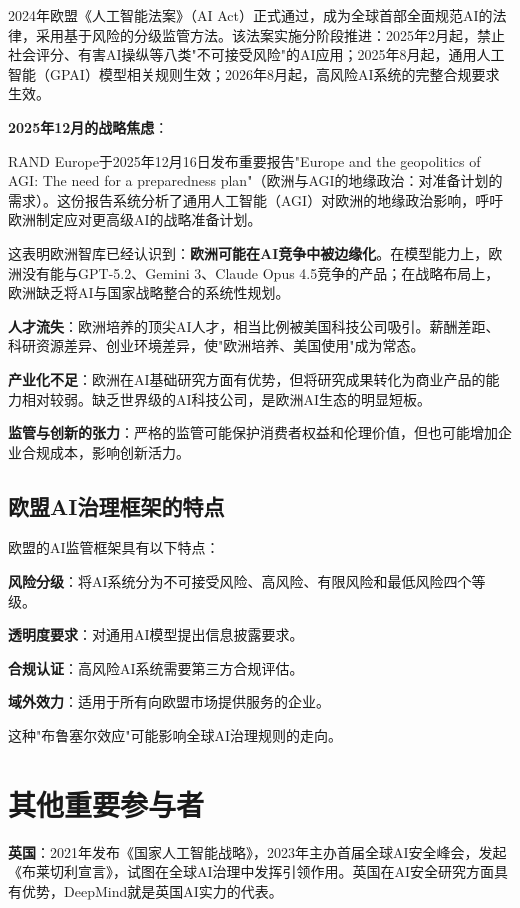 2024年欧盟《人工智能法案》（AI Act）正式通过，成为全球首部全面规范AI的法律，采用基于风险的分级监管方法。该法案实施分阶段推进：2025年2月起，禁止社会评分、有害AI操纵等八类"不可接受风险"的AI应用；2025年8月起，通用人工智能（GPAI）模型相关规则生效；2026年8月起，高风险AI系统的完整合规要求生效。

\textbf{2025年12月的战略焦虑}：

RAND Europe于2025年12月16日发布重要报告"Europe and the geopolitics of AGI: The need for a preparedness plan"（欧洲与AGI的地缘政治：对准备计划的需求）。这份报告系统分析了通用人工智能（AGI）对欧洲的地缘政治影响，呼吁欧洲制定应对更高级AI的战略准备计划。

这表明欧洲智库已经认识到：\textbf{欧洲可能在AI竞争中被边缘化}。在模型能力上，欧洲没有能与GPT-5.2、Gemini 3、Claude Opus 4.5竞争的产品；在战略布局上，欧洲缺乏将AI与国家战略整合的系统性规划。

\textbf{人才流失}：欧洲培养的顶尖AI人才，相当比例被美国科技公司吸引。薪酬差距、科研资源差异、创业环境差异，使"欧洲培养、美国使用"成为常态。

\textbf{产业化不足}：欧洲在AI基础研究方面有优势，但将研究成果转化为商业产品的能力相对较弱。缺乏世界级的AI科技公司，是欧洲AI生态的明显短板。

\textbf{监管与创新的张力}：严格的监管可能保护消费者权益和伦理价值，但也可能增加企业合规成本，影响创新活力。

\subsection{欧盟AI治理框架的特点}

欧盟的AI监管框架具有以下特点：

\textbf{风险分级}：将AI系统分为不可接受风险、高风险、有限风险和最低风险四个等级。

\textbf{透明度要求}：对通用AI模型提出信息披露要求。

\textbf{合规认证}：高风险AI系统需要第三方合规评估。

\textbf{域外效力}：适用于所有向欧盟市场提供服务的企业。

这种"布鲁塞尔效应"可能影响全球AI治理规则的走向。

\section{其他重要参与者}

\textbf{英国}：2021年发布《国家人工智能战略》，2023年主办首届全球AI安全峰会，发起《布莱切利宣言》，试图在全球AI治理中发挥引领作用。英国在AI安全研究方面具有优势，DeepMind就是英国AI实力的代表。

